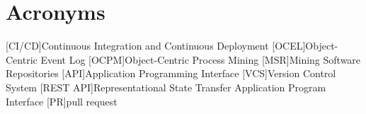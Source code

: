 \chapter*{Acronyms}
\begin{acronym}
[CI/CD]{Continuous Integration and Continuous Deployment}
[OCEL]{Object-Centric Event Log}
[OCPM]{Object-Centric Process Mining}
[MSR]{Mining Software Repositories}
[API]{Application Programming Interface}
[VCS]{Version Control System}
[REST API]{Representational State Transfer Application Program Interface}
[PR]{pull request}
\end{acronym}
